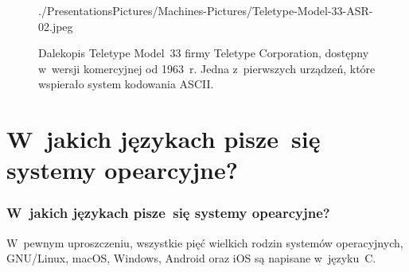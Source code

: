 \documentclass[10pt,t]{beamer}
\begin{document}
\begin{frame}
\begin{figure}
    {./PresentationsPictures/Machines-Pictures/Teletype-Model-33-ASR-02.jpeg}

    \caption{Dalekopis Teletype Model~33 firmy Teletype Corporation,
      dostępny w~wersji komercyjnej od 1963~r. Jedna z~pierwszych urządzeń,
      które wspierało system kodowania ASCII. }

    \label{fig:Teletype-Model-33-ASR}

  \end{figure}

\end{frame}










\section{W~jakich językach pisze~się systemy opearcyjne?}



\begin{frame}
  \frametitle{W~jakich językach pisze~się systemy opearcyjne?}


  W~pewnym uproszczeniu, wszystkie pięć wielkich rodzin systemów
  operacyjnych, GNU/Linux, macOS, Windows, Android oraz iOS są napisane
  w~języku~C.

\end{frame}
\end{document}
